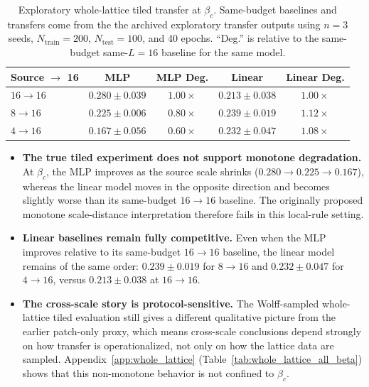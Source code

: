 \documentclass[12pt,a4paper]{memoir}
\begin{document}
\begin{table}[ht]
    \centering
    \caption{Exploratory whole-lattice tiled transfer at $\beta_c$.
        Same-budget baselines and transfers come from the
        the archived exploratory transfer outputs
        using $n=3$ seeds, $N_{\mathrm{train}}=200$, $N_{\mathrm{test}}=100$,
        and 40 epochs.  ``Deg.'' is relative to the same-budget same-$L=16$
        baseline for the same model.}
    \begin{tabular}{lcccc}
        \toprule
        \textbf{Source $\to$ 16} & \textbf{MLP} & \textbf{MLP Deg.} & \textbf{Linear} & \textbf{Linear Deg.} \\
        \midrule
        $16 \to 16$ & $0.280 \pm 0.039$ & $1.00\times$ & $0.213 \pm 0.038$ & $1.00\times$ \\
        $8 \to 16$  & $0.225 \pm 0.006$ & $0.80\times$ & $0.239 \pm 0.019$ & $1.12\times$ \\
        $4 \to 16$  & $0.167 \pm 0.056$ & $0.60\times$ & $0.232 \pm 0.047$ & $1.08\times$ \\
        \bottomrule
    \end{tabular}
    \label{tab:whole_lattice_transfer}
\end{table}

\begin{itemize}
    \item \textbf{The true tiled experiment does not support monotone degradation.}
        At $\beta_c$, the MLP improves as the source scale shrinks
        ($0.280 \to 0.225 \to 0.167$), whereas the linear model moves in the
        opposite direction and becomes slightly worse than its same-budget
        $16\to16$ baseline.  The originally proposed monotone scale-distance
        interpretation therefore fails in this local-rule setting.
    \item \textbf{Linear baselines remain fully competitive.}
        Even when the MLP improves relative to its same-budget $16\to16$
        baseline, the linear model remains of the same order:
        $0.239 \pm 0.019$ for $8\to16$ and $0.232 \pm 0.047$ for $4\to16$,
        versus $0.213 \pm 0.038$ at $16\to16$.
    \item \textbf{The cross-scale story is protocol-sensitive.}
        The Wolff-sampled whole-lattice tiled evaluation still gives a different
        qualitative picture from the earlier patch-only proxy, which means
        cross-scale conclusions depend strongly on how transfer is operationalized,
        not only on how the lattice data are sampled.
        Appendix~\ref{app:whole_lattice} (Table~\ref{tab:whole_lattice_all_beta})
        shows that this non-monotone behavior is not confined to $\beta_c$.
\end{itemize}
\end{document}
